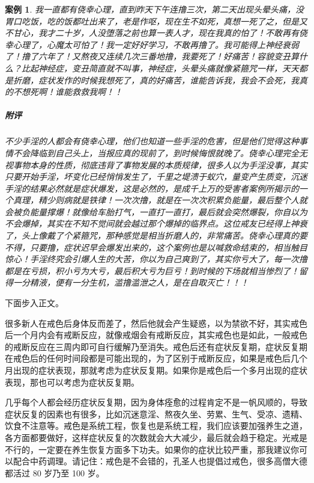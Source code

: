 \documentclass[fontset=founder]{ctexart}
\newtheorem{case}{案例}
\begin{document}
\begin{case}
    我一直都有侥幸心理，直到昨天下午连撸三次，第二天出现头晕头痛，没胃口吃饭，吃的饭都吐出来了，老是作呕，现在生不如死，真想一死了之，但是又不甘心，我才二十岁，人没堕落之前也算一表人才，现在我真的怕了！不敢再有侥幸心理了，心魔太可怕了！我一定好好学习，不敢再撸了。我可能得上神经衰弱了！撸了六年了！又熬夜又连续几次三番地撸，我要死了！好痛苦！容貌变丑算什么？比起神经症，变丑简直就不叫事，神经症，头晕头痛就像紧箍咒一样，天天都是折磨，症状发作的时候我想死了，真的好痛苦，谁能告诉我，我会不会死，我真的不想死啊！谁能救救我啊！！

    \subparagraph{附评} 不少手淫的人都会有侥幸心理，他们也知道一些手淫的危害，但是他们觉得这种事情不会降临到自己头上，当报应真的现前了，到时候悔恨就晚了。侥幸心理完全无视事物本身的性质，彻底违背了事物发展的本质规律，很多人以为手淫没事，其实只要开始手淫，坏变化已经悄悄发生了，千里之堤溃于蚁穴，量变产生质变，沉迷手淫的结果必然就是症状爆发，这是必然的，是成千上万的受害者案例所揭示的一个真理，精少则病就是铁律！一次次撸，就是在一次次积累负能量，最后整个人就会被负能量撑爆！就像给车胎打气，一直打一直打，最后就会突然爆裂，你自以为不会爆掉，其实在不知不觉间就会越过那个爆掉的临界点。这位戒友已经得上神衰了，头上像戴了个紧箍咒，那种感觉是相当折磨人的，非常痛苦。侥幸心理真的要不得，只要撸，症状迟早会爆发出来的，这个案例也是以喊救命结束的，相当触目惊心！手淫终究会引爆人生的大苦，你以为自己爽到了，其实你亏大了，每一次撸都是在亏损，积小亏为大亏，最后积大亏为巨亏！到时候的下场就相当惨烈了！留得一分精液，便有一分生机，滥撸滥泄之人，是在自取灭亡！！！
\end{case}

下面步入正文。

很多新人在戒色后身体反而差了，然后他就会产生疑惑，以为禁欲不好，其实戒色后一个月内会有戒断反应，就像戒烟会有戒断反应，其实戒色也是如此，一般戒色的戒断反应在三周内即可自行缓解乃至消失。戒色后还有症状反复期，症状反复期在戒色后的任何时间段都是可能出现的，为了区别于戒断反应，如果是戒色后几个月出现的症状表现，那就考虑为症状反复期。如果你是戒色后一个多月出现的症状表现，那也可以考虑为症状反复期。

几乎每个人都会经历症状反复期，因为身体痊愈的过程肯定不是一帆风顺的，导致症状反复的因素也有很多，比如沉迷意淫、熬夜久坐、劳累、生气、受凉、遗精、饮食不注意等。戒色是系统工程，恢复也是系统工程，我们应该要加强养生之道，各方面都要做好，这样症状反复的次数就会大大减少，最后就会趋于稳定。光戒是不行的，一定要在养生恢复方面多下功夫。如果你的症状比较严重，那我建议你可以配合中药调理。请记住：戒色是不会错的，孔圣人也提倡过戒色，很多高僧大德都活过 80 岁乃至 100 岁。
\end{document}
